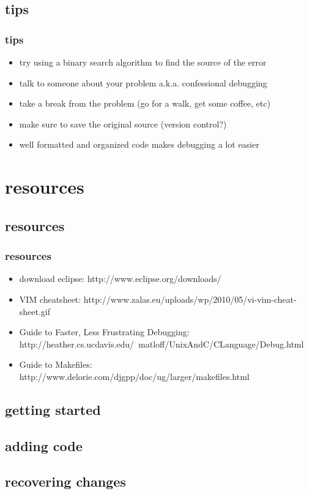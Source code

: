 \documentclass[hyperref={pdfpagelabels=false}]{beamer}
\begin{document}
	\subsection{tips}
		\frame
		{
		    \frametitle{tips}
		    \begin{itemize}
		    \item{try using a binary search algorithm to find the source of the error}
		    \item{talk to someone about your problem a.k.a. confessional debugging}
		    \item{take a break from the problem (go for a walk, get some coffee, etc)}
		    \item{make sure to save the original source (version control?)}
		    \item{well formatted and organized code makes debugging a lot easier}
		    \end{itemize}
		}
\section{resources}
	\subsection{resources}
	\frame
	{
	    \frametitle{resources}
	    \begin{itemize}
	    \item{download eclipse: http://www.eclipse.org/downloads/}
	    \item{VIM cheatsheet: http://www.zalas.eu/uploads/wp/2010/05/vi-vim-cheat-sheet.gif}
	    \item{Guide to Faster, Less Frustrating Debugging: http://heather.cs.ucdavis.edu/~matloff/UnixAndC/CLanguage/Debug.html}
	    \item{Guide to Makefiles: http://www.delorie.com/djgpp/doc/ug/larger/makefiles.html}
	    \end{itemize}
	}
\subsection{getting started}
\subsection{adding code}
\subsection{recovering changes}
\end{document}
